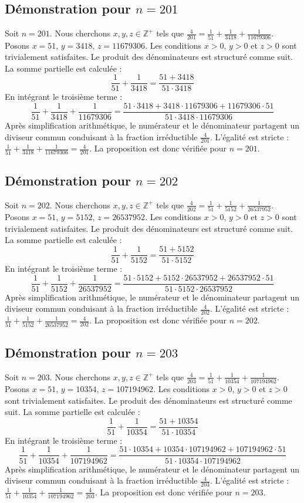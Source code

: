 \documentclass[11pt,a4paper]{article}
\begin{document}
\subsection{Démonstration pour $n = 201$}
Soit $n = 201$. Nous cherchons $x, y, z \in \mathbb{Z}^{+}$ tels que $\frac{4}{201} = \frac{1}{51} + \frac{1}{3418} + \frac{1}{11679306}$.
Posons $x = 51$, $y = 3418$, $z = 11679306$.
Les conditions $x > 0$, $y > 0$ et $z > 0$ sont trivialement satisfaites.
Le produit des dénominateurs est structuré comme suit. La somme partielle est calculée :
$$ \frac{1}{51} + \frac{1}{3418} = \frac{51+3418}{51 \cdot 3418} $$
En intégrant le troisième terme :
$$ \frac{1}{51} + \frac{1}{3418} + \frac{1}{11679306} = \frac{51 \cdot 3418 + 3418 \cdot 11679306 + 11679306 \cdot 51}{51 \cdot 3418 \cdot 11679306} $$
Après simplification arithmétique, le numérateur et le dénominateur partagent un diviseur commun conduisant à la fraction irréductible $\frac{4}{201}$.
L'égalité est stricte : $\frac{1}{51} + \frac{1}{3418} + \frac{1}{11679306} = \frac{4}{201}$.
La proposition est donc vérifiée pour $n = 201$.
\subsection{Démonstration pour $n = 202$}
Soit $n = 202$. Nous cherchons $x, y, z \in \mathbb{Z}^{+}$ tels que $\frac{4}{202} = \frac{1}{51} + \frac{1}{5152} + \frac{1}{26537952}$.
Posons $x = 51$, $y = 5152$, $z = 26537952$.
Les conditions $x > 0$, $y > 0$ et $z > 0$ sont trivialement satisfaites.
Le produit des dénominateurs est structuré comme suit. La somme partielle est calculée :
$$ \frac{1}{51} + \frac{1}{5152} = \frac{51+5152}{51 \cdot 5152} $$
En intégrant le troisième terme :
$$ \frac{1}{51} + \frac{1}{5152} + \frac{1}{26537952} = \frac{51 \cdot 5152 + 5152 \cdot 26537952 + 26537952 \cdot 51}{51 \cdot 5152 \cdot 26537952} $$
Après simplification arithmétique, le numérateur et le dénominateur partagent un diviseur commun conduisant à la fraction irréductible $\frac{4}{202}$.
L'égalité est stricte : $\frac{1}{51} + \frac{1}{5152} + \frac{1}{26537952} = \frac{4}{202}$.
La proposition est donc vérifiée pour $n = 202$.
\subsection{Démonstration pour $n = 203$}
Soit $n = 203$. Nous cherchons $x, y, z \in \mathbb{Z}^{+}$ tels que $\frac{4}{203} = \frac{1}{51} + \frac{1}{10354} + \frac{1}{107194962}$.
Posons $x = 51$, $y = 10354$, $z = 107194962$.
Les conditions $x > 0$, $y > 0$ et $z > 0$ sont trivialement satisfaites.
Le produit des dénominateurs est structuré comme suit. La somme partielle est calculée :
$$ \frac{1}{51} + \frac{1}{10354} = \frac{51+10354}{51 \cdot 10354} $$
En intégrant le troisième terme :
$$ \frac{1}{51} + \frac{1}{10354} + \frac{1}{107194962} = \frac{51 \cdot 10354 + 10354 \cdot 107194962 + 107194962 \cdot 51}{51 \cdot 10354 \cdot 107194962} $$
Après simplification arithmétique, le numérateur et le dénominateur partagent un diviseur commun conduisant à la fraction irréductible $\frac{4}{203}$.
L'égalité est stricte : $\frac{1}{51} + \frac{1}{10354} + \frac{1}{107194962} = \frac{4}{203}$.
La proposition est donc vérifiée pour $n = 203$.
\end{document}
